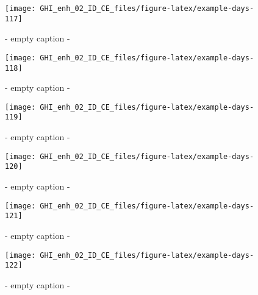 \documentclass[
  10pt,
  a4paper,oneside]{article}
\begin{document}
\begin{figure}[H]

{\centering \texttt{[image: GHI\_enh\_02\_ID\_CE\_files/figure-latex/example-days-117]} 

}

\caption{ - empty caption - }\label{fig:example-days-117}
\end{figure}

\begin{figure}[H]

{\centering \texttt{[image: GHI\_enh\_02\_ID\_CE\_files/figure-latex/example-days-118]} 

}

\caption{ - empty caption - }\label{fig:example-days-118}
\end{figure}

\begin{figure}[H]

{\centering \texttt{[image: GHI\_enh\_02\_ID\_CE\_files/figure-latex/example-days-119]} 

}

\caption{ - empty caption - }\label{fig:example-days-119}
\end{figure}

\begin{figure}[H]

{\centering \texttt{[image: GHI\_enh\_02\_ID\_CE\_files/figure-latex/example-days-120]} 

}

\caption{ - empty caption - }\label{fig:example-days-120}
\end{figure}

\begin{figure}[H]

{\centering \texttt{[image: GHI\_enh\_02\_ID\_CE\_files/figure-latex/example-days-121]} 

}

\caption{ - empty caption - }\label{fig:example-days-121}
\end{figure}

\begin{figure}[H]

{\centering \texttt{[image: GHI\_enh\_02\_ID\_CE\_files/figure-latex/example-days-122]} 

}

\caption{ - empty caption - }\label{fig:example-days-122}
\end{figure}
\end{document}

